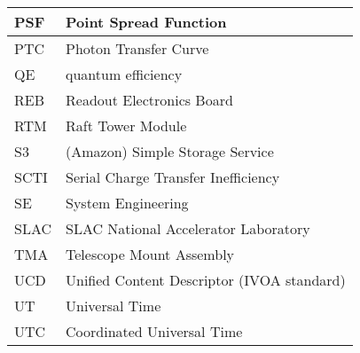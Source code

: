 \begin{longtable}{p{}p{}}
PSF & Point Spread Function \\\hline
PTC & Photon Transfer Curve \\\hline
QE & quantum efficiency \\\hline
REB & Readout Electronics Board \\\hline
RTM & Raft Tower Module \\\hline
S3 & (Amazon) Simple Storage Service \\\hline
SCTI & Serial Charge Transfer Inefficiency \\\hline
SE & System Engineering \\\hline
SLAC & SLAC National Accelerator Laboratory \\\hline
TMA & Telescope Mount Assembly \\\hline
UCD & Unified Content Descriptor (IVOA standard) \\\hline
UT & Universal Time \\\hline
UTC & Coordinated Universal Time \\\hline
\end{longtable}
